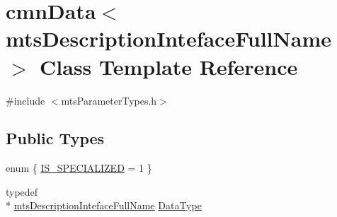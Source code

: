 \hypertarget{classcmn_data_3_01mts_description_inteface_full_name_01_4}{\section{cmn\-Data$<$ mts\-Description\-Inteface\-Full\-Name $>$ Class Template Reference}
\label{classcmn_data_3_01mts_description_inteface_full_name_01_4}
}


{\ttfamily \#include $<$mts\-Parameter\-Types.\-h$>$}

\subsection*{Public Types}
\begin{DoxyCompactItemize}
\item 
enum \{ \hyperlink{classcmn_data_3_01mts_description_inteface_full_name_01_4_a50a7f5a7c498087f0c754053433fd413aaea0ce1591d188d502852f254da6c22c}{I\-S\-\_\-\-S\-P\-E\-C\-I\-A\-L\-I\-Z\-E\-D} = 1
 \}
\item 
typedef \\*
\hyperlink{classmts_description_inteface_full_name}{mts\-Description\-Inteface\-Full\-Name} \hyperlink{classcmn_data_3_01mts_description_inteface_full_name_01_4_a7c49303638b183151217d48ca5d2eda8}{Data\-Type}
\end{DoxyCompactItemize}
